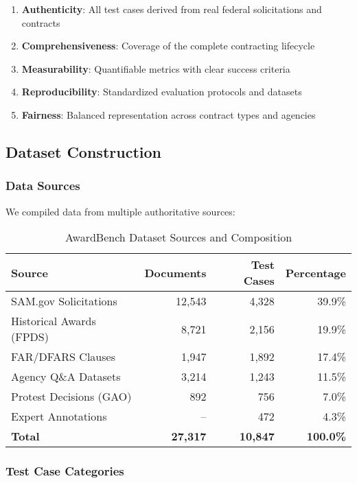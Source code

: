 \documentclass[11pt,a4paper]{article}
\begin{document}
\begin{enumerate}
    \item \textbf{Authenticity}: All test cases derived from real federal solicitations and contracts
    \item \textbf{Comprehensiveness}: Coverage of the complete contracting lifecycle
    \item \textbf{Measurability}: Quantifiable metrics with clear success criteria
    \item \textbf{Reproducibility}: Standardized evaluation protocols and datasets
    \item \textbf{Fairness}: Balanced representation across contract types and agencies
\end{enumerate}

\subsection{Dataset Construction}

\subsubsection{Data Sources}

We compiled data from multiple authoritative sources:

\begin{table}[H]
\centering
\caption{AwardBench Dataset Sources and Composition}
\label{tab:dataset}
\begin{tabular}{@{}lrrr@{}}
\toprule
\textbf{Source} & \textbf{Documents} & \textbf{Test Cases} & \textbf{Percentage} \\
\midrule
SAM.gov Solicitations & 12,543 & 4,328 & 39.9\% \\
Historical Awards (FPDS) & 8,721 & 2,156 & 19.9\% \\
FAR/DFARS Clauses & 1,947 & 1,892 & 17.4\% \\
Agency Q\&A Datasets & 3,214 & 1,243 & 11.5\% \\
Protest Decisions (GAO) & 892 & 756 & 7.0\% \\
Expert Annotations & -- & 472 & 4.3\% \\
\midrule
\textbf{Total} & \textbf{27,317} & \textbf{10,847} & \textbf{100.0\%} \\
\bottomrule
\end{tabular}
\end{table}

\subsubsection{Test Case Categories}
\end{document}
